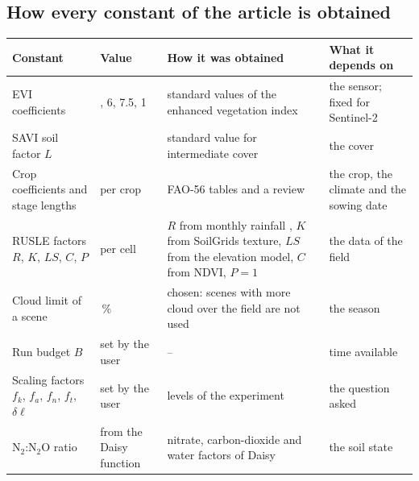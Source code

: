 \subsection{How every constant of the article is obtained}
{\small\begin{longtable}{>{\raggedright\arraybackslash}p{}>{\raggedright\arraybackslash}p{}>{\raggedright\arraybackslash}p{}>{\raggedright\arraybackslash}p{}}
\toprule Constant & Value & How it was obtained & What it depends on\\\midrule\endhead
EVI coefficients & 2.5, 6, 7.5, 1 & standard values of the enhanced vegetation index \citep{Huete2002} & the sensor; fixed for Sentinel-2\\
SAVI soil factor $L$ & 0.5 & standard value for intermediate cover \citep{Huete1988} & the cover\\
Crop coefficients and stage lengths & per crop & FAO-56 tables and a review & the crop, the climate and the sowing date\\
RUSLE factors $R$, $K$, $LS$, $C$, $P$ & per cell & $R$ from monthly rainfall \citep{Renard1994}, $K$ from SoilGrids texture, $LS$ from the elevation model, $C$ from NDVI, $P=1$ & the data of the field\\
Cloud limit of a scene & 30\,\% & chosen: scenes with more cloud over the field are not used & the season\\
Run budget $B$ & set by the user & -- & time available\\
Scaling factors $f_k$, $f_a$, $f_n$, $f_t$, $\delta\ell$ & set by the user & levels of the experiment & the question asked\\
N$_2$:N$_2$O ratio & from the Daisy function & nitrate, carbon-dioxide and water factors of Daisy & the soil state\\\bottomrule
\end{longtable}}
